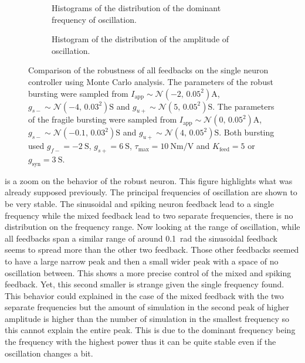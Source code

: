 \begin{figure}[!htbp]
    \centering
    \begin{subfigure}[t][.43\textheight][b]{\textwidth}
        \centering
        \caption{Histograms of the distribution of the dominant frequency of oscillation.}
        \label{fig:single_monte_freq}
    \end{subfigure}
    
    \begin{subfigure}[b][.43\textheight][t]{\textwidth}
        \centering
        \caption{Histogram of the distribution of the amplitude of oscillation.}
        \label{fig:single_monte_range}
    \end{subfigure}
    \caption{Comparison of the robustness of all feedbacks on the single neuron controller using Monte Carlo analysis. 
    The parameters of the robust bursting were sampled from $I_\text{app} \sim \mathcal{N}\left(-2,\, 0.05^2\right) \unit{\ampere}$, $g_{s-} \sim \mathcal{N}\left(-4,\, 0.03^2\right) \unit{\siemens}$ and $g_{u+} \sim \mathcal{N}\left(5,\, 0.05^2\right) \unit{\siemens}$. 
    The parameters of the fragile bursting were sampled from $I_\text{app} \sim \mathcal{N}\left(0,\, 0.05^2\right) \unit{\ampere}$, $g_{s-} \sim \mathcal{N}\left(-0.1,\, 0.03^2\right) \unit{\siemens}$ and $g_{u+} \sim \mathcal{N}\left(4,\, 0.05^2\right) \unit{\siemens}$. 
    Both bursting used $g_{f-} = \qty{-2}{\siemens}$, $g_{s+} = \qty{6}{\siemens}$, $\tau_\text{max} = \qty{10}{\newton\meter\per\volt}$ and $K_\text{feed} = 5$ or $g_{\text{syn}} = \qty{3}{\siemens}$.}
    \label{fig:single_monte}
\end{figure}

 is a zoom on the behavior of the robust neuron. 
This figure highlights what was already supposed previously. The principal frequencies of oscillation are shown to be very stable. 
The sinusoidal and spiking neuron feedback lead to a single frequency while the mixed feedback lead to two separate frequencies, there is no distribution on the frequency range.
Now looking at the range of oscillation, while all feedbacks span a similar range of around \qty{0.1}{\radian} the sinusoidal feedback seems to spread more than the other two feedback.
Those other feedbacks seemed to have a large narrow peak and then a small wider peak with a space of no oscillation between. 
This shows a more precise control of the mixed and spiking feedback. 
Yet, this second smaller is strange given the single frequency found.
This behavior could explained in the case of the mixed feedback with the two separate frequencies but the amount of simulation in the second peak of higher amplitude is higher than the number of simulation in the smallest frequency so this cannot explain the entire peak.
This is due to the dominant frequency being the frequency with the highest power thus it can be quite stable even if the oscillation changes a bit.

